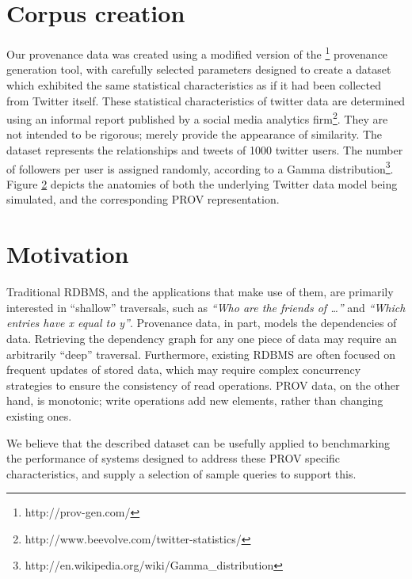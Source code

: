 \documentclass{llncs2e/llncs}
\begin{document}
\section{Corpus creation}
%
Our provenance data was created using a modified version of the \provGen{}\footnote{http://prov-gen.com/} provenance generation tool, with carefully selected parameters designed to create a dataset which exhibited the same statistical characteristics as if it had been collected from Twitter itself.
%
These statistical characteristics of twitter data are determined using an informal report published by a social media analytics firm\footnote{http://www.beevolve.com/twitter-statistics/}.
%
They are not intended to be rigorous; merely provide the appearance of similarity.
%
The dataset represents the relationships and tweets of 1000 twitter users.
%
The number of followers per user is assigned randomly, according to a Gamma distribution\footnote{http://en.wikipedia.org/wiki/Gamma\_distribution}.
%
Figure \ref{} depicts the anatomies of both the underlying Twitter data model being simulated, and the corresponding PROV representation.
%

%
\section{Motivation}
%
Traditional RDBMS, and the applications that make use of them, are primarily interested in ``shallow'' traversals, such as \textit{``Who are the friends of \ldots''} and \textit{``Which entries have x equal to y''}.
%
Provenance data, in part, models the dependencies of data.
%
Retrieving the dependency graph for any one piece of data may require an arbitrarily ``deep'' traversal.
%
Furthermore, existing RDBMS are often focused on frequent updates of stored data, which may require complex concurrency strategies to ensure the consistency of read operations. 
%
PROV data, on the other hand, is monotonic; write operations add new elements, rather than changing existing ones. 
%

%
We believe that the described dataset can be usefully applied to benchmarking the performance of systems designed to address these PROV specific characteristics, and supply a selection of sample queries to support this.
%
\end{document}
